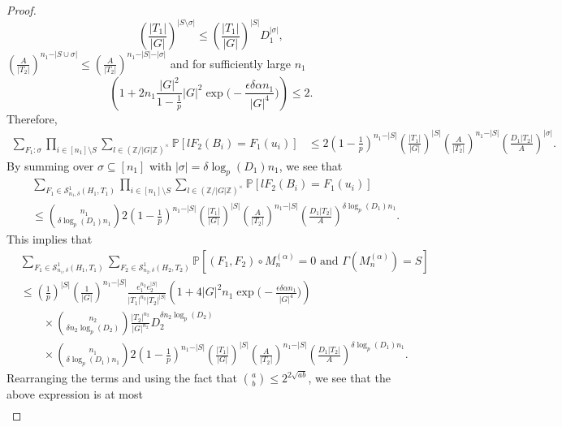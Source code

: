 \documentclass[12pt]{amsart}
\theoremstyle{definition}
\newcommand{\PPP}{\mathbb{P}}
\newcommand{\SSO}[3]{\mathcal{S}^1_{#1}(#2,#3)}
\newcommand{\Mna}{M_{n}^{(\alpha)}}
\newcommand{\abs}[1]{\vert#1\vert}
\newcommand{\Z}{\mathbb{Z}}
\begin{document}
\begin{proof}
\[\left(\frac{\abs{T_1}}{\abs{G}}\right)^{\abs{S\setminus \sigma}}
\leq \left(\frac{\abs{T_1}}{\abs{G}}\right)^{\abs{S}} D_1^{\abs{\sigma}},
\]
$\left(\frac{A}{\abs{T_2}}\right)^{n_1-\abs{S\cup \sigma}}\leq \left(\frac{A}{\abs{T_2}}\right)^{n_1-\abs{S}-\abs{\sigma}}$ and for sufficiently large $n_1$
\[
\left(1+ 2n_1\frac{\abs{G}^2}{1-\frac{1}{p}} \abs{G}^2\exp\Big(-\frac{\epsilon\delta \alpha n_1}{|G|^4}\Big)\right)
\leq 2.
\]
Therefore,
\begin{align*}
\sum_{F_1:\sigma}
\prod_{i\in [n_1]\setminus S} \sum_{l\in (\Z/\abs{G}\Z)^{\times}} \PPP[l F_2(B_i)= F_1(u_i)]
&\leq 2 (1-\tfrac{1}{p})^{n_1-\abs{S}}
\left(\frac{\abs{T_1}}{\abs{G}}\right)^{\abs{S}}
\left(\frac{A}{\abs{T_2}}\right)^{n_1-\abs{S}}
\left(\frac{D_1\abs{T_2}}{A}\right)^{\abs{\sigma}}.
\end{align*}
By summing over $\sigma\subseteq[n_1]$ with $\abs{\sigma}= \delta\log_p(D_1) n_1$, we see that
\begin{align*}
&\sum_{F_1\in \SSO{n_1,\delta}{H_1}{T_1}}
\prod_{i\in [n_1]\setminus S} \sum_{l\in (\Z/\abs{G}\Z)^{\times}} \PPP[l F_2(B_i)= F_1(u_i)]\\
&\leq \binom{n_1}{\delta\log_p(D_1) n_1}
2 (1-\tfrac{1}{p})^{n_1-\abs{S}}
\left(\frac{\abs{T_1}}{\abs{G}}\right)^{\abs{S}}
\left(\frac{A}{\abs{T_2}}\right)^{n_1-\abs{S}}
\left(\frac{D_1\abs{T_2}}{A}\right)^{\delta\log_p(D_1) n_1}.
\end{align*}
This implies that
\begin{align*}
&\sum_{F_1\in \SSO{n_1,\delta}{H_1}{T_1}}
\sum_{F_2\in \SSO{n_2,\delta}{H_2}{T_2}}
\PPP[(F_1,F_2)\circ \Mna=0 \text{ and } \Gamma(\Mna)=S]\\
&\leq (\tfrac{1}{p})^{\abs{S}} (\tfrac{1}{\abs{G}})^{n_1-\abs{S}}
\frac{e_1^{n_2} e_2^{\abs{S}}}{\abs{T_1}^{n_2} \abs{T_2}^{\abs{S}}}
\left(1+4\abs{G}^2n_1 \exp\Big(-\frac{\epsilon \delta \alpha n_1}{|G|^4}\Big) \right)\\
&\quad\quad\times \binom{n_2}{\delta n_2\log_p(D_2)} \frac{\abs{T_2}^{n_2}}{\abs{G}^{n_2}} D_2^{\delta n_2\log_p(D_2)}\\
&\quad\quad\times\binom{n_1}{\delta\log_p(D_1) n_1}
2 (1-\tfrac{1}{p})^{n_1-\abs{S}}
\left(\frac{\abs{T_1}}{\abs{G}}\right)^{\abs{S}}
\left(\frac{A}{\abs{T_2}}\right)^{n_1-\abs{S}}
\left(\frac{D_1\abs{T_2}}{A}\right)^{\delta\log_p(D_1) n_1}.
\end{align*}
Rearranging the terms and using the fact that $\binom{a}{b}\leq 2^{2\sqrt{ab}}$, we see that the above expression is at most
\begin{align*}

\end{align*}
\end{proof}
\end{document}
